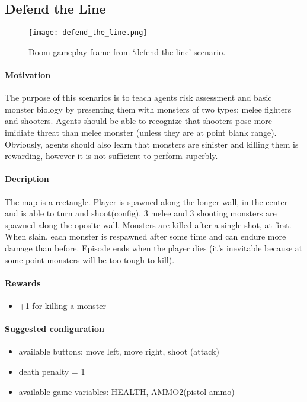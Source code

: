 	\subsection{Defend the Line}
		\begin{figure}
			\centering
			\texttt{[image: defend\_the\_line.png]}
			\caption{Doom gameplay frame from `defend the line' scenario.}\label{fig:defend_the_line}
		\end{figure}
		\paragraph{Motivation} 
			The purpose of this scenarios is to teach agents risk assessment and basic monster biology by presenting them with monsters of two types: melee fighters and shooters. Agents should be able to recognize that shooters pose more imidiate threat than melee monster (unless they are at point blank range). Obviously, agents should also learn that monsters are sinister and killing them is rewarding, however it is not sufficient to perform superbly.
		\paragraph{Decription}
			The map is a rectangle. Player is spawned along the longer wall, in the center and is able to turn and shoot(config). 3 melee and 3 shooting monsters are spawned along the oposite wall. Monsters are killed after a single shot, at first. When slain, each monster is respawned after some time and can endure more damage than before. Episode ends when the player dies (it's inevitable because at some point monsters will be too tough to kill).
		\paragraph{Rewards}
			\begin{itemize}
				\item +1 for killing a monster
			\end{itemize}

		\paragraph{Suggested configuration}
			\begin{itemize}
				\item available buttons: move left, move right, shoot (attack)
				\item death penalty = 1
				\item available game variables: HEALTH, AMMO2(pistol ammo)
			\end{itemize}
	\newpage

